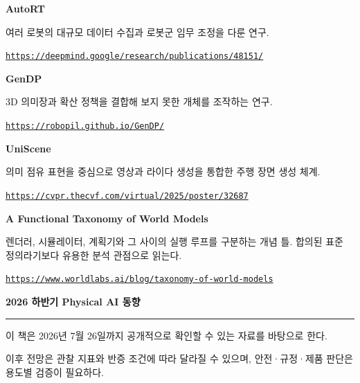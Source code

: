 \documentclass[11pt,openany]{book}
\newcommand{\sourceitem}[3]{%
  \par\smallskip\noindent
  {\sffamily\bfseries\color{deepblue}#1}\par
  {\footnotesize #2\par\href{#3}{\nolinkurl{#3}}}\par
}
\begin{document}
\sourceitem{AutoRT}
{여러 로봇의 대규모 데이터 수집과 로봇군 임무 조정을 다룬 연구.}
{https://deepmind.google/research/publications/48151/}

\sourceitem{GenDP}
{3D 의미장과 확산 정책을 결합해 보지 못한 개체를 조작하는 연구.}
{https://robopil.github.io/GenDP/}

\sourceitem{UniScene}
{의미 점유 표현을 중심으로 영상과 라이다 생성을 통합한 주행 장면 생성 체계.}
{https://cvpr.thecvf.com/virtual/2025/poster/32687}

\sourceitem{A Functional Taxonomy of World Models}
{렌더러, 시뮬레이터, 계획기와 그 사이의 실행 루프를 구분하는 개념 틀. 합의된 표준 정의라기보다 유용한 분석 관점으로 읽는다.}
{https://www.worldlabs.ai/blog/taxonomy-of-world-models}

\cleardoublepage
\thispagestyle{empty}
\vspace*{\fill}
\begin{center}
{\sffamily\bfseries\Large\color{deepblue}2026 하반기 Physical AI 동향}\par
\vspace{6mm}
{\color{coral}\rule{35mm}{1.5pt}}\par
\vspace{6mm}
{\small
이 책은 2026년 7월 26일까지 공개적으로 확인할 수 있는 자료를 바탕으로 한다.\par
이후 전망은 관찰 지표와 반증 조건에 따라 달라질 수 있으며, 안전·규정·제품 판단은 용도별 검증이 필요하다.}
\end{center}
\vspace*{\fill}
\end{document}
